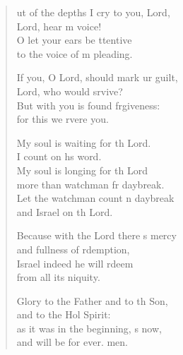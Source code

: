 \settowidth{\versewidth}{Out of the depths I cry to you, O Lord, *}
\begin{verse}%
  \begin{patverse}
ut of the depths I cry to you,  Lord,\Med\\
    Lord, hear m voice!\\
O let your ears be ttentive\Med\\
    to the voice of m pleading.

If you, O Lord, should mark ur guilt,\Med\\
    Lord, who would srvive?\\
But with you is found frgiveness:\Med\\
    for this we rvere you.

My soul is waiting for th Lord.\Med\\
    I count on h\pointup{\i}s word.\\
My soul is longing for th Lord\Med\\
    more than watchman fr daybreak.\\
Let the watchman count n daybreak\Med\\
    and Israel on th Lord.

Because with the Lord there \pointup{\i}s mercy\Med\\
    and fullness of rdemption,\\
Israel indeed he will rdeem\Med\\
    from all its \pointup{\i}niquity.

Glory to the Father and to th Son,\Med\\
    and to the Hol Spirit:\\
as it was in the beginning, \pointup{\i}s now,\Med\\
    and will be for ever. men.
  \end{patverse}
\end{verse}
